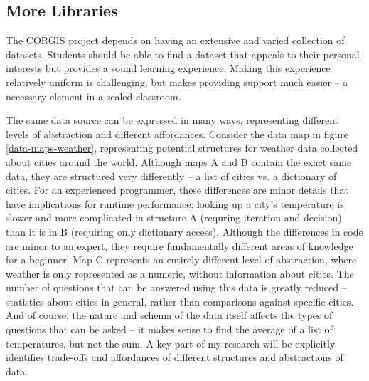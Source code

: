 \subsection{More Libraries}

The CORGIS project depends on having an extensive and varied collection of datasets. 
Students should be able to find a dataset that appeals to their personal interests but provides a sound learning experience.
Making this experience relatively uniform is challenging, but makes providing support much easier -- a necessary element in a scaled classroom.

The same data source can be expressed in many ways, representing different levels of abstraction and different affordances.
Consider the data map in figure \ref{data-maps-weather}, representing potential structures for weather data collected about cities around the world.
Although maps A and B contain the exact same data, they are structured very differently -- a list of cities vs. a dictionary of cities.
For an experienced programmer, these differences are minor details that have implications for runtime performance: looking up a city's temperature is slower and more complicated in structure A (requring iteration and decision) than it is in B (requiring only dictionary access).
Although the differences in code are minor to an expert, they require fundamentally different areas of knowledge for a beginner.
Map C represents an entirely different level of abstraction, where weather is only represented as a numeric, without information about cities.
The number of questions that can be answered using this data is greatly reduced -- statistics about cities in general, rather than comparisons against specific cities.
And of course, the nature and schema of the data itself affects the types of questions that can be asked -- it makes sense to find the average of a list of temperatures, but not the sum.
A key part of my research will be explicitly identifies trade-offs and affordances of different structures and abstractions of data.

